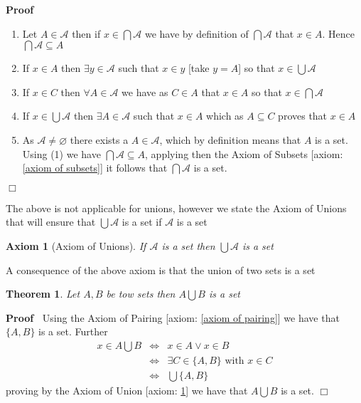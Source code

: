 \documentclass{book}
\newenvironment{proof}{\noindent\textbf{Proof\ }}{\hspace*{\fill}$\Box$\medskip}
\newtheorem{axiom}{Axiom}
{\theorembodyfont{\rmfamily}\newtheorem{convention}{Convention}}
\newtheorem{theorem}{Theorem}
\begin{document}
\begin{proof}
  
  \begin{enumerate}
    \item Let $A \in \mathcal{A}$ then if $x \in \bigcap \mathcal{A}$ we have
    by definition of $\bigcap \mathcal{A}$ that $x \in A$. Hence $\bigcap
    \mathcal{A} \subseteq A$
    
    \item If $x \in A$ then $\exists y \in \mathcal{A}$ such that $x \in y$
    [take $y = A$] so that $x \in \bigcup \mathcal{A}$
    
    \item If $x \in C$ then $\forall A \in \mathcal{A}$ we have as $C \in A$
    that $x \in A$ so that $x \in \bigcap \mathcal{A}$
    
    \item If $x \in \bigcup \mathcal{A}$ then $\exists A \in \mathcal{A}$ such
    that $x \in A$ which as $A \subseteq C$ proves that $x \in A$
    
    \item As $\mathcal{A} \neq \varnothing$ there exists a $A \in
    \mathcal{A}$, which by definition means that $A$ is a set. Using (1) we
    have $\bigcap \mathcal{A} \subseteq A$, applying then the Axiom of Subsets
    [axiom: \ref{axiom of subsets}] it follows that $\bigcap \mathcal{A}$ is a
    set.
  \end{enumerate}
\end{proof}

The above is not applicable for unions, however we state the Axiom of Unions
that will ensure that $\bigcup \mathcal{A}$ is a set if $\mathcal{A}$ is a set

\begin{axiom}[Axiom of Unions]
  \label{axiom of union}{}If $\mathcal{A}$ is a set then
  $\bigcup \mathcal{A}$ is a set
\end{axiom}

A consequence of the above axiom is that the union of two sets is a set

\begin{theorem}
  \label{set union of two sets is a set}Let $A, B$ be tow sets then $A \bigcup
  B$ is a set
\end{theorem}

\begin{proof}
  Using the Axiom of Pairing [axiom: \ref{axiom of pairing}] we have that $\{
  A, B \}$ is a set. Further
  \begin{eqnarray*}
    x \in A \bigcup B & \Leftrightarrow & x \in A \vee x \in B\\
    & \Leftrightarrow & \exists C \in \{ A, B \} \text{ with } x \in C\\
    & \Leftrightarrow & \bigcup \{ A, B \}
  \end{eqnarray*}
  proving by the Axiom of Union [axiom: \ref{axiom of union}] we have that $A
  \bigcup B$ is a set.
\end{proof}
\end{document}
